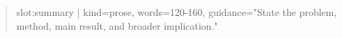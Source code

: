 \begin{abstract}
{{slot:summary | kind=prose, words=120-160, guidance="State the problem, method, main result, and broader implication."}}
\end{abstract}
